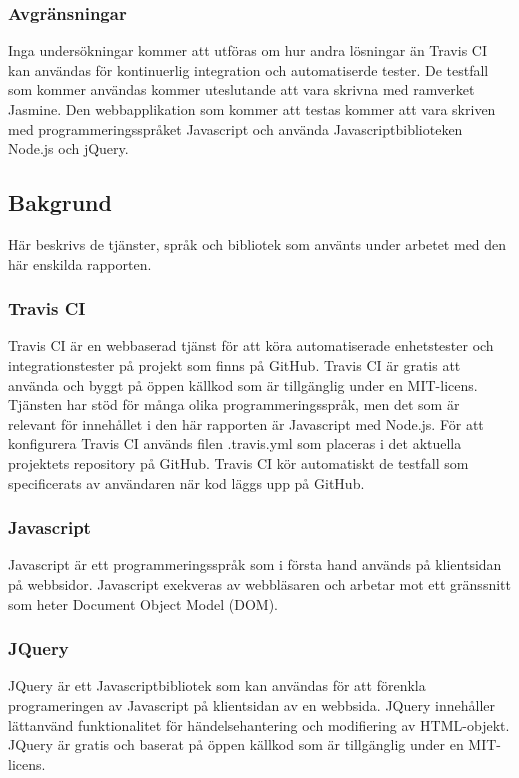 \subsubsection{Avgränsningar}
Inga undersökningar kommer att utföras om hur andra lösningar än 
Travis CI kan användas för kontinuerlig 
integration och automatiserde tester. De testfall som kommer användas 
kommer uteslutande att vara skrivna med ramverket Jasmine. Den webbapplikation
som kommer att testas kommer att vara skriven med programmeringsspråket
Javascript och använda Javascriptbiblioteken Node.js och jQuery.

\subsection{Bakgrund}
Här beskrivs de tjänster, språk och bibliotek som använts under arbetet
med den här enskilda rapporten.

\subsubsection{Travis CI}
Travis CI är en webbaserad tjänst för att köra automatiserade enhetstester och integrationstester
på projekt som finns på GitHub. Travis CI är gratis att använda och byggt på öppen källkod
som är tillgänglig under en MIT-licens. 
Tjänsten har stöd för många olika programmeringsspråk, men det som är 
relevant för innehållet i den här rapporten
är Javascript med Node.js. För att konfigurera Travis CI används filen .travis.yml 
som placeras i det aktuella
projektets repository på GitHub.
Travis CI kör automatiskt de testfall som specificerats av användaren 
när kod läggs upp på GitHub.

\subsubsection{Javascript}
Javascript är ett programmeringsspråk som i första hand används på klientsidan på webbsidor.
Javascript exekveras av webbläsaren och arbetar mot ett gränssnitt som heter 
Document Object Model (DOM).

\subsubsection{JQuery}
JQuery är ett Javascriptbibliotek som kan användas för att förenkla programeringen
av Javascript på klientsidan av en webbsida. JQuery innehåller lättanvänd
funktionalitet för händelsehantering och modifiering av HTML-objekt.
JQuery är gratis och baserat på öppen källkod som är tillgänglig under en
MIT-licens.

